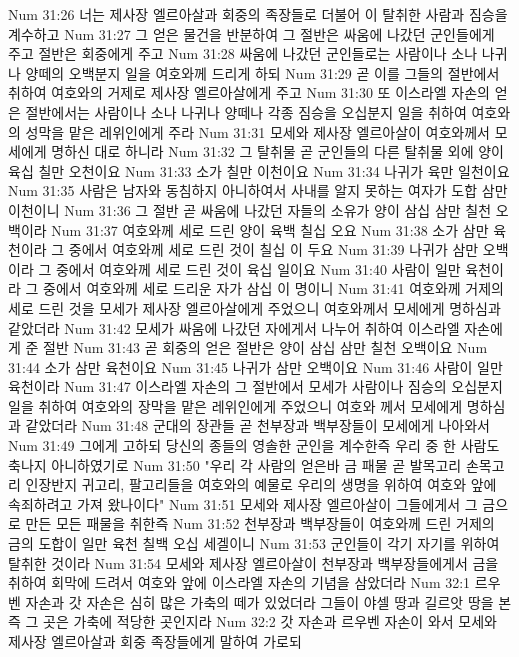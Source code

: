 Num 31:26  너는 제사장 엘르아살과 회중의 족장들로 더불어 이 탈취한 사람과 짐승을 계수하고
Num 31:27  그 얻은 물건을 반분하여 그 절반은 싸움에 나갔던 군인들에게 주고 절반은 회중에게 주고
Num 31:28  싸움에 나갔던 군인들로는 사람이나 소나 나귀나 양떼의 오백분지 일을 여호와께 드리게 하되
Num 31:29  곧 이를 그들의 절반에서 취하여 여호와의 거제로 제사장 엘르아살에게 주고
Num 31:30  또 이스라엘 자손의 얻은 절반에서는 사람이나 소나 나귀나 양떼나 각종 짐승을 오십분지 일을 취하여 여호와의 성막을 맡은 레위인에게 주라
Num 31:31  모세와 제사장 엘르아살이 여호와께서 모세에게 명하신 대로 하니라
Num 31:32  그 탈취물 곧 군인들의 다른 탈취물 외에 양이 육십 칠만 오천이요
Num 31:33  소가 칠만 이천이요
Num 31:34  나귀가 육만 일천이요
Num 31:35  사람은 남자와 동침하지 아니하여서 사내를 알지 못하는 여자가 도합 삼만 이천이니
Num 31:36  그 절반 곧 싸움에 나갔던 자들의 소유가 양이 삼십 삼만 칠천 오백이라
Num 31:37  여호와께 세로 드린 양이 육백 칠십 오요
Num 31:38  소가 삼만 육천이라 그 중에서 여호와께 세로 드린 것이 칠십 이 두요
Num 31:39  나귀가 삼만 오백이라 그 중에서 여호와께 세로 드린 것이 육십 일이요
Num 31:40  사람이 일만 육천이라 그 중에서 여호와께 세로 드리운 자가 삼십 이 명이니
Num 31:41  여호와께 거제의 세로 드린 것을 모세가 제사장 엘르아살에게 주었으니 여호와께서 모세에게 명하심과 같았더라
Num 31:42  모세가 싸움에 나갔던 자에게서 나누어 취하여 이스라엘 자손에게 준 절반
Num 31:43  곧 회중의 얻은 절반은 양이 삼십 삼만 칠천 오백이요
Num 31:44  소가 삼만 육천이요
Num 31:45  나귀가 삼만 오백이요
Num 31:46  사람이 일만 육천이라
Num 31:47  이스라엘 자손의 그 절반에서 모세가 사람이나 짐승의 오십분지 일을 취하여 여호와의 장막을 맡은 레위인에게 주었으니 여호와 께서 모세에게 명하심과 같았더라
Num 31:48  군대의 장관들 곧 천부장과 백부장들이 모세에게 나아와서
Num 31:49  그에게 고하되 당신의 종들의 영솔한 군인을 계수한즉 우리 중 한 사람도 축나지 아니하였기로
Num 31:50  "우리 각 사람의 얻은바 금 패물 곧 발목고리 손목고리 인장반지 귀고리, 팔고리들을 여호와의 예물로 우리의 생명을 위하여 여호와 앞에 속죄하려고 가져 왔나이다"
Num 31:51  모세와 제사장 엘르아살이 그들에게서 그 금으로 만든 모든 패물을 취한즉
Num 31:52  천부장과 백부장들이 여호와께 드린 거제의 금의 도합이 일만 육천 칠백 오십 세겔이니
Num 31:53  군인들이 각기 자기를 위하여 탈취한 것이라
Num 31:54  모세와 제사장 엘르아살이 천부장과 백부장들에게서 금을 취하여 회막에 드려서 여호와 앞에 이스라엘 자손의 기념을 삼았더라
Num 32:1  르우벤 자손과 갓 자손은 심히 많은 가축의 떼가 있었더라 그들이 야셀 땅과 길르앗 땅을 본즉 그 곳은 가축에 적당한 곳인지라
Num 32:2  갓 자손과 르우벤 자손이 와서 모세와 제사장 엘르아살과 회중 족장들에게 말하여 가로되
